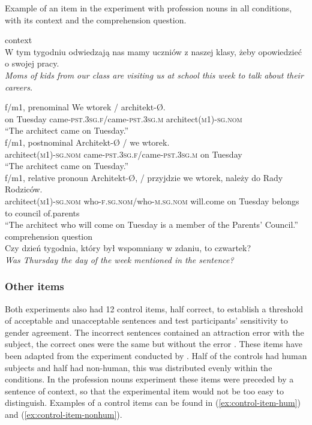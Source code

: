 \begin{exe}
  \ex\label{ex:prof-item} Example of an item in the experiment with profession nouns in all conditions, with its context and the comprehension question.
  \begin{xlist}
    \ex context\\
    W tym tygodniu odwiedzają nas mamy uczniów z naszej klasy, żeby opowiedzieć o swojej pracy.\\
    \textsl{Moms of kids from our class are visiting us at school this week to talk about their careers.}
    
    \ex f/m1, prenominal
    \gll We wtorek / architekt-Ø.\\
    on Tuesday came\textsc{-pst.3sg.f}/came\textsc{-pst.3sg.m} architect\textsc{(m1)-sg.nom}\\
    \glt ``The architect came on Tuesday.''\\
    
    \ex f/m1, postnominal
    \gll Architekt-Ø / we wtorek.\\
    architect\textsc{(m1)-sg.nom} came\textsc{-pst.3sg.f}/came\textsc{-pst.3sg.m} on Tuesday\\
    \glt ``The architect came on Tuesday.''\\
    
    \ex f/m1, relative pronoun
    \gll Architekt-Ø, / przyjdzie we wtorek, należy do Rady Rodziców.\\
    architect\textsc{(m1)-sg.nom} who\textsc{-f.sg.nom}/who\textsc{-m.sg.nom} will.come on Tuesday belongs to council of.parents\\
    \glt ``The architect who will come on Tuesday is a member of the Parents' Council.''\\

    \ex comprehension question\\
    Czy dzień tygodnia, który był wspomniany w zdaniu, to czwartek?\\
    \textsl{Was Thursday the day of the week mentioned in the sentence?}
  \end{xlist}
\end{exe}

\subsubsection{Other items}
Both experiments also had 12 control items, half correct, to establish a threshold of acceptable and unacceptable sentences and test participants' sensitivity to gender agreement. The incorrect sentences contained an attraction error with the subject, the correct ones were the same but without the error \citep{bock1991broken}. These items have been adapted from the experiment conducted by \cite{an_closest_2022}. Half of the controls had human subjects and half had non-human, this was distributed evenly within the conditions. In the profession nouns experiment these items were preceded by a sentence of context, so that the experimental item would not be too easy to distinguish. Examples of a control items can be found in (\ref{ex:control-item-hum}) and (\ref{ex:control-item-nonhum}).

